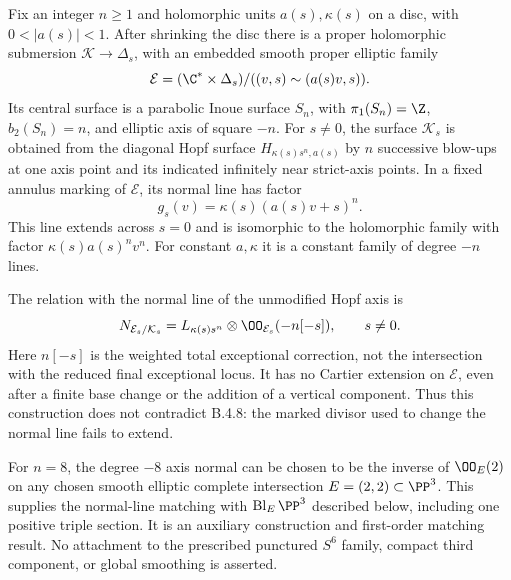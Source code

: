 \begin{proposition}
Fix an integer $n\ge1$ and holomorphic units $a(s),\kappa(s)$ on a
disc, with $0<|a(s)|<1$. After shrinking the disc there is a proper
holomorphic submersion $\mathcal K\to\Delta_s$, with an embedded smooth
proper elliptic family
\[
 \mathcal E=(\C^*\times\Delta_s)/
       ((v,s)\sim(a(s)v,s)).
\]
Its central surface is a parabolic Inoue surface $S_n$, with
$\pi_1(S_n)=\Z$, $b_2(S_n)=n$, and elliptic axis of square $-n$.
For $s\ne0$, the surface $\mathcal K_s$ is obtained from the diagonal
Hopf surface $H_{\kappa(s)s^n,a(s)}$ by $n$ successive blow-ups at one
axis point and its indicated infinitely near strict-axis points.
In a fixed annulus marking of $\mathcal E$, its normal line has factor
\[
 g_s(v)=\kappa(s)(a(s)v+s)^n.
\]
This line extends across $s=0$ and is isomorphic to the holomorphic
family with factor $\kappa(s)a(s)^n v^n$.
For constant $a,\kappa$ it is a constant family of degree $-n$ lines.

The relation with the normal line of the unmodified Hopf axis is
\[
 N_{\mathcal E_s/\mathcal K_s}
   =L_{\kappa(s)s^n}\otimes\OO_{\mathcal E_s}(-n[-s]),
       \qquad s\ne0.
\]
Here $n[-s]$ is the weighted total exceptional correction, not the
intersection with the reduced final exceptional locus. It has no
Cartier extension on $\mathcal E$, even after a finite base change or
the addition of a vertical component. Thus this construction does
not contradict B.4.8: the marked divisor used to change the normal
line fails to extend.

For $n=8$, the degree $-8$ axis normal can be chosen to be the inverse
of $\OO_E(2)$ on any chosen smooth elliptic complete intersection
$E=(2,2)\subset\PP^3$. This supplies the normal-line matching with
$\operatorname{Bl}_E\PP^3$ described below, including one positive
triple section. It is an auxiliary construction and first-order
matching result. No attachment to the prescribed punctured
$S^6$ family, compact third component, or global smoothing is asserted.
\end{proposition}
